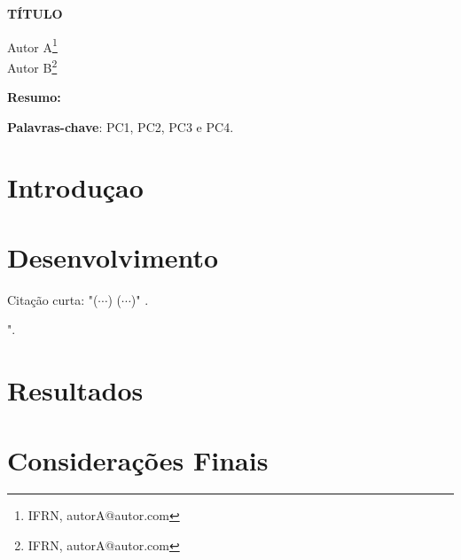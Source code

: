 \documentclass[article,12pt,oneside,a4paper,english,brazil,sumario=tradicional]{abntex2}
\begin{document}
\frenchspacing %

\begin{center}
\uppercase{\bfseries{Título}}
\vspace{12pt}
\end{center}

\begin{flushright}
	Autor A\footnote{IFRN, autorA@autor.com}
	\\
	Autor B\footnote{IFRN, autorA@autor.com}
	\vspace{12pt}
\end{flushright}

\begin{footnotesize}
\SingleSpacing
\noindent
\small{\textbf{Resumo:}}
\noindent
\small

\lipsum[1]

\noindent
\textbf{Palavras-chave}: PC1, PC2, PC3 e PC4.
\end{footnotesize}

\textual
\pagestyle{simple}

\section{Introduçao}
\normalsize
\lipsum[2-4]

\section{Desenvolvimento}
\lipsum[5-7] Citação curta: "($\cdots$) \lipsum[8] ($\cdots$)" \cite[p.~34]{tanebaum2010}. 
 
\vspace{24pt} %
\begin{citacao}
"\lipsum[9-10]\cite[p.~34]{tanebaum2010}. 
\end{citacao}
\vspace{24pt} %

\lipsum[12-14]

\section{Resultados}
\lipsum[18-19]

\section{Considerações Finais}
\lipsum[20-21]
\end{document}
